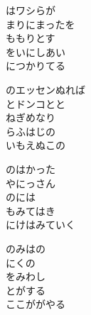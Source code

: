 \documentclass[10pt,b5j]{tarticle} %
\begin{document}
\vspace{1.5em} %
\newcommand{\linespace}{0.5em} %
\newcommand{\blocksize}{0.5\hsize} %
\begin{enumerate} %
    \begin{minipage}[c]{\blocksize}
    
        \vspace{\linespace}
        \item
        はワシらが\\
        まりにまったを\\
        ももりとす\\
        をいにしあい\\
        につかりてる
        
        \vspace{\linespace}
        \item
        のエッセンぬれば\\
        とドンコとと\\
        ねぎめなり\\
        らふはじの\\
        いもえぬこの
        
        \vspace{\linespace}
        \item
        のはかった\\
        やにっさん\\
        のには\\
        もみてはき\\
        にけはみていく
        
        \vspace{\linespace}
        \item
        のみはの\\
        にくの\\
        をみわし\\
        とがする\\
        ここががやる
    
    \end{minipage}
\end{enumerate} %
\end{document}
